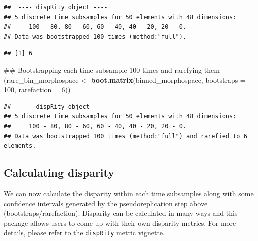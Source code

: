 \documentclass[]{book}
\newenvironment{Shaded}{\begin{snugshade}}{\end{snugshade}}
\newcommand{\KeywordTok}[1]{\textcolor[rgb]{0.13,0.29,0.53}{\textbf{#1}}}
\newcommand{\DataTypeTok}[1]{\textcolor[rgb]{0.13,0.29,0.53}{#1}}
\newcommand{\DecValTok}[1]{\textcolor[rgb]{0.00,0.00,0.81}{#1}}
\newcommand{\StringTok}[1]{\textcolor[rgb]{0.31,0.60,0.02}{#1}}
\newcommand{\OperatorTok}[1]{\textcolor[rgb]{0.81,0.36,0.00}{\textbf{#1}}}
\newcommand{\NormalTok}[1]{#1}
\theoremstyle{definition}
\theoremstyle{definition}
\theoremstyle{remark}
\begin{document}
\begin{verbatim}
##  ---- dispRity object ---- 
## 5 discrete time subsamples for 50 elements with 48 dimensions:
##     100 - 80, 80 - 60, 60 - 40, 40 - 20, 20 - 0.
## Data was bootstrapped 100 times (method:"full").
\end{verbatim}

\begin{Shaded}
\end{Shaded}

\begin{verbatim}
## [1] 6
\end{verbatim}

\begin{Shaded}
\begin{Highlighting}[]
\NormalTok{## Bootstrapping each time subsample 100 times and rarefying them }
\NormalTok{(rare_bin_morphospace <-}\StringTok{ }\KeywordTok{boot.matrix}\NormalTok{(binned_morphospace, }\DataTypeTok{bootstraps =} \DecValTok{100}\NormalTok{,}
    \DataTypeTok{rarefaction =} \DecValTok{6}\NormalTok{))}
\end{Highlighting}
\end{Shaded}

\begin{verbatim}
##  ---- dispRity object ---- 
## 5 discrete time subsamples for 50 elements with 48 dimensions:
##     100 - 80, 80 - 60, 60 - 40, 40 - 20, 20 - 0.
## Data was bootstrapped 100 times (method:"full") and rarefied to 6 elements.
\end{verbatim}

\subsection{Calculating disparity}\label{calculating-disparity-1}

We can now calculate the disparity within each time subsamples along
with some confidence intervals generated by the pseudoreplication step
above (bootstraps/rarefaction). Disparity can be calculated in many ways
and this package allows users to come up with their own disparity
metrics. For more details, please refer to the
\href{http://htmlpreview.github.com/?https://github.com/TGuillerme/dispRity/blob/master/doc/dispRity-metrics.html}{\texttt{dispRity}
metric vignette}.
\end{document}
